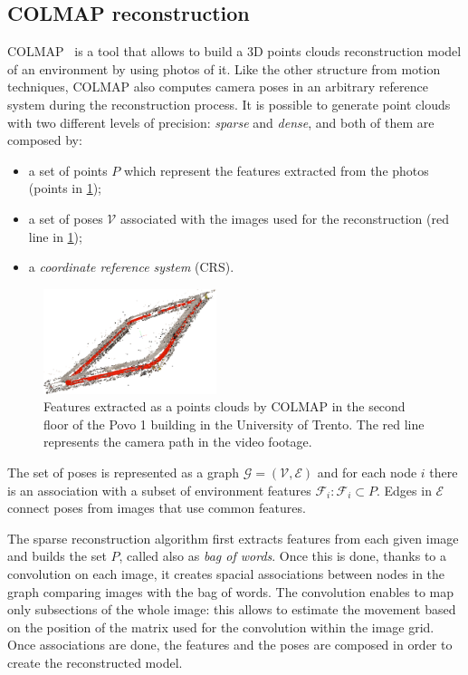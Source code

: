 \subsection{COLMAP reconstruction}
COLMAP~\cite{colmap} is a tool that allows to build a 3D points clouds reconstruction model of an environment by using photos of it.
Like the other structure from motion techniques, COLMAP also computes camera poses in an arbitrary reference system during the reconstruction process.
It is possible to generate point clouds with two different levels of precision: \emph{sparse} and \emph{dense}, and both of them are composed by:
\begin{itemize}
    \item a set of points $P$ which represent the features extracted from the photos (points in \cref{fig:features-colmap});
    \item a set of poses $\mathcal{V}$ associated with the images used for the reconstruction (red line in \cref{fig:features-colmap});
    \item a \emph{coordinate reference system} (CRS).
\end{itemize}

\begin{figure}[htbp]
    \begin{center}
        \includegraphics[width=0.45\textwidth]{./imgs/extracted_features_colmap.png}
    \end{center}
    \caption{Features extracted as a points clouds by COLMAP in the second floor of the Povo 1 building in the University of Trento. The red line represents the camera path in the video footage.}
    \label{fig:features-colmap}
\end{figure}

The set of poses is represented as a graph $\mathcal{G}=(\mathcal{V}, \mathcal{E})$ and for each node $i$ there is an association with a subset of environment features $\mathcal{F}_i : \mathcal{F}_i\subset P$. Edges in $\mathcal{E}$ connect poses from images that use common features.

The sparse reconstruction algorithm first extracts features from each given image and builds the set $P$, called also as \emph{bag of words}. Once this is done, thanks to a convolution on each image, it creates spacial associations between nodes in the graph comparing images with the bag of words. The convolution enables to map only subsections of the whole image: this allows to estimate the movement based on the position of the matrix used for the convolution within the image grid. Once associations are done, the features and the poses are composed in order to create the reconstructed model.

